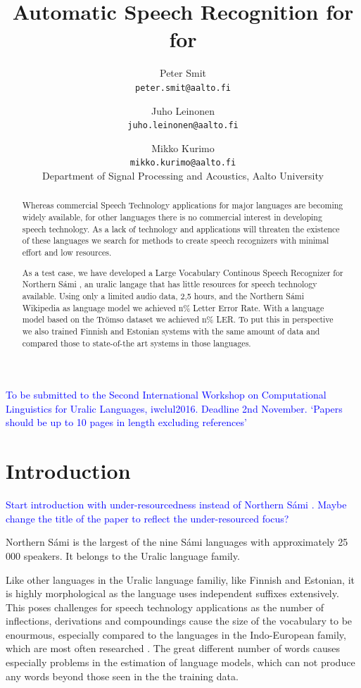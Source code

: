\documentclass[b5paper]{article}
\title{Automatic Speech Recognition for  for \ns}
\author{Peter Smit \\ \texttt{peter.smit@aalto.fi} \and Juho Leinonen \\ \texttt{juho.leinonen@aalto.fi} \and Mikko Kurimo\\ \texttt{mikko.kurimo@aalto.fi}  \\
[0.5cm]Department of Signal Processing and Acoustics, Aalto University\\}
\newcommand{\note}[1]{{\textcolor{blue}{#1}}}
\newcommand{\ns}{{Northern Sámi }}
\begin{document}
\maketitle

\begin{abstract} 
Whereas commercial Speech Technology applications for major languages are becoming widely available, for other languages there is no commercial interest in developing speech technology. As a lack of technology and applications will threaten the existence of these languages we search for methods to create speech recognizers with minimal effort and low resources.

As a test case, we have developed a Large Vocabulary Continous Speech Recognizer for \ns, an uralic langage that has little resources for speech technology available. Using only a limited audio data, 2,5 hours, and the \ns Wikipedia as language model we achieved n\% Letter Error Rate. With a language model based on the Trömso dataset we achieved n\% LER. To put this in perspective we also trained Finnish and Estonian systems with the same amount of data and compared those to state-of-the art systems in those languages. 
\end{abstract}

\note{To be submitted to the Second International Workshop on Computational Linguistics for Uralic Languages, iwclul2016. Deadline 2nd November. `Papers should be up to 10 pages in length excluding references'}
\section{Introduction}

\note{Start introduction with under-resourcedness instead of \ns . Maybe change the title of the paper to reflect the under-resourced focus? }

\ns is the largest of the nine Sámi languages with approximately 25 000 speakers. It belongs to the Uralic language family. \cite{ethno18}

Like other languages in the Uralic language familiy, like Finnish and Estonian, it is highly morphological as the language uses independent suffixes extensively. This poses challenges for speech technology applications as the number of inflections, derivations and compoundings cause the size of the vocabulary to be enourmous, especially compared to the languages in the Indo-European family, which are most often researched \cite{karlsson1982}.  The great different number of words causes especially problems in the estimation of language models, which can not produce any words beyond those seen in the the training data. 
\end{document}
